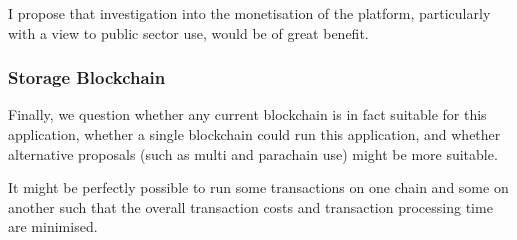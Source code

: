 I propose that investigation into the monetisation of the platform, particularly with a view to public sector use, would be of great benefit.

\subsubsection{Storage Blockchain}

Finally, we question whether any current blockchain is in fact suitable for this application, whether a single blockchain could run this application, and whether alternative proposals (such as multi and parachain use) might be more suitable.

It might be perfectly possible to run some transactions on one chain and some on another such that the overall transaction costs and transaction processing time are minimised.

